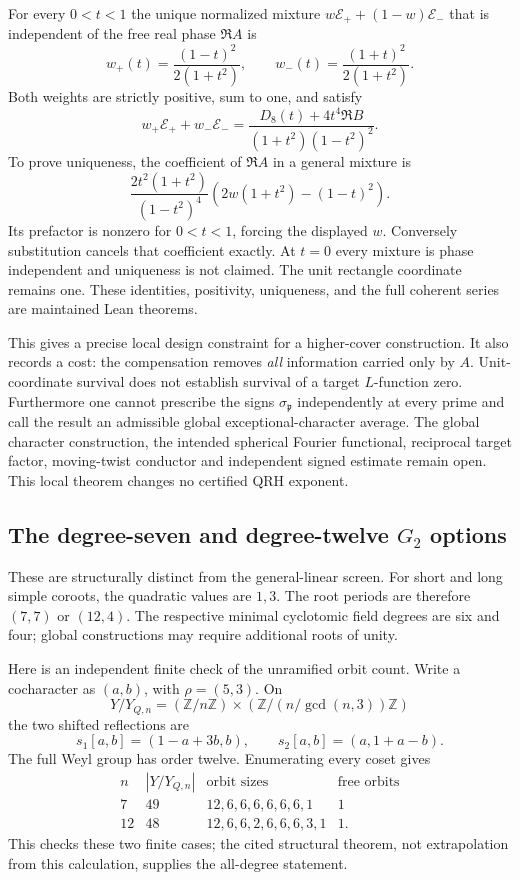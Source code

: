 \documentclass[11pt]{article}
\newcommand{\ZZ}{\mathbb Z}
\begin{document}
For every $0<t<1$ the unique normalized mixture
$w\mathcal E_++(1-w)\mathcal E_-$ that is independent of the free
real phase $\Re A$ is
\[
 w_+(t)=\frac{(1-t)^2}{2(1+t^2)},\qquad
 w_-(t)=\frac{(1+t)^2}{2(1+t^2)}.
\]
Both weights are strictly positive, sum to one, and satisfy
\[
 \boxed{\quad
 w_+\mathcal E_++w_-\mathcal E_-
 =\frac{D_8(t)+4t^4\Re B}
 {(1+t^2)(1-t^2)^2}.\quad}
\]
To prove uniqueness, the coefficient of $\Re A$ in a general mixture
is
\[
 \frac{2t^2(1+t^2)}
 {(1-t^2)^4}
 \left(2w(1+t^2)-(1-t)^2\right).
\]
Its prefactor is nonzero for $0<t<1$, forcing the displayed $w$.
Conversely substitution cancels that coefficient exactly.
At $t=0$ every mixture is phase independent and uniqueness is not claimed.
The unit rectangle coordinate remains one.
These identities, positivity, uniqueness, and the full coherent
series are maintained Lean theorems.

This gives a precise local design constraint for a higher-cover
construction. It also records a cost: the compensation removes
\emph{all} information carried only by $A$. Unit-coordinate survival
does not establish survival of a target $L$-function zero.
Furthermore one cannot prescribe the signs $\sigma_{\mathfrak p}$
independently at every prime and call the result an admissible global
exceptional-character average. The global character construction,
the intended spherical Fourier functional, reciprocal target factor,
moving-twist conductor and independent signed estimate remain open.
This local theorem changes no certified QRH exponent.

\subsection{The degree-seven and degree-twelve $G_2$ options}

These are structurally distinct from the general-linear screen.
For short and long simple coroots, the quadratic values are $1,3$.
The root periods are therefore $(7,7)$ or $(12,4)$.
The respective minimal cyclotomic field degrees are six and four;
global constructions may require additional roots of unity.

Here is an independent finite check of the unramified orbit count.
Write a cocharacter as $(a,b)$, with $\rho=(5,3)$.
On
\[
 Y/Y_{Q,n}=(\ZZ/n\ZZ)\times
            (\ZZ/(n/\gcd(n,3))\ZZ)
\]
the two shifted reflections are
\[
 s_1[a,b]=(1-a+3b,b),\qquad
 s_2[a,b]=(a,1+a-b).
\]
The full Weyl group has order twelve. Enumerating every coset gives
\[
\begin{array}{c|c|l|c}
 n& |Y/Y_{Q,n}|&\text{orbit sizes}&\text{free orbits}\\ \hline
 7&49&12,6,6,6,6,6,6,1&1\\
 12&48&12,6,6,2,6,6,6,3,1&1 .
\end{array}
\]
This checks these two finite cases; the cited structural theorem,
not extrapolation from this calculation, supplies the all-degree statement.
\end{document}
